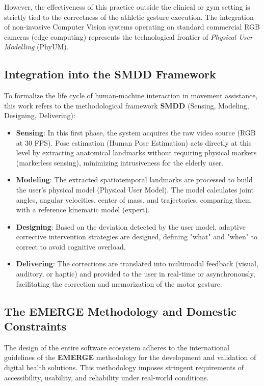 \documentclass[a4paper,11pt]{article}
\begin{document}
However, the effectiveness of this practice outside the clinical or gym setting is strictly tied to the correctness of the athletic gesture execution. The integration of non-invasive Computer Vision systems operating on standard commercial RGB cameras (edge computing) represents the technological frontier of \textit{Physical User Modelling} (PhyUM).

\subsection{Integration into the SMDD Framework}
To formalize the life cycle of human-machine interaction in movement assistance, this work refers to the methodological framework \textbf{SMDD} (Sensing, Modeling, Designing, Delivering):
\begin{itemize}
    \item \textbf{Sensing}: In this first phase, the system acquires the raw video source (RGB at 30 FPS). Pose estimation (Human Pose Estimation) acts directly at this level by extracting anatomical landmarks without requiring physical markers (markerless sensing), minimizing intrusiveness for the elderly user.
    \item \textbf{Modeling}: The extracted spatiotemporal landmarks are processed to build the user's physical model (Physical User Model). The model calculates joint angles, angular velocities, center of mass, and trajectories, comparing them with a reference kinematic model (expert).
    \item \textbf{Designing}: Based on the deviation detected by the user model, adaptive corrective intervention strategies are designed, defining "what" and "when" to correct to avoid cognitive overload.
    \item \textbf{Delivering}: The corrections are translated into multimodal feedback (visual, auditory, or haptic) and provided to the user in real-time or asynchronously, facilitating the correction and memorization of the motor gesture.
\end{itemize}

\subsection{The EMERGE Methodology and Domestic Constraints}
The design of the entire software ecosystem adheres to the international guidelines of the \textbf{EMERGE} methodology for the development and validation of digital health solutions. This methodology imposes stringent requirements of accessibility, usability, and reliability under real-world conditions.
\end{document}
